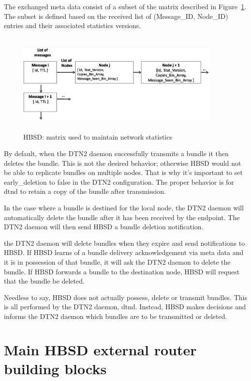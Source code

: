 The exchanged meta data consist of a subset of the matrix described in Figure~\ref{Stat-Mat}. The subset is defined based on the received list of (Message\_ID, Node\_ID) entries and their associated statistics versions.


\begin{figure}[!h]
\centering
\includegraphics[width=4in,height=2in]{Chapitre4/Stat_Matrix.eps}
\caption{HBSD: matrix used to maintain network statistics}
\label{Stat-Mat}
\end{figure}

By default, when the DTN2 daemon successfully transmits a bundle it then deletes the bundle. This is
not the desired behavior; otherwise HBSD would not be able to replicate bundles on
multiple nodes. That is why it's important to set early\_deletion to false in the DTN2
configuration. The proper behavior is for dtnd to retain a copy of the bundle after
transmission.

In the case where a bundle is destined for the local node, the DTN2 daemon will automatically delete
the bundle after it has been received by the endpoint. The DTN2 daemon will then send HBSD a
bundle deletion notification.

the DTN2 daemon will delete bundles when they expire and send notifications to HBSD.
If HBSD learns of a bundle delivery acknowledgement via meta data and it is in
possession of that bundle, it will ask the DTN2 daemon to delete the bundle.
If HBSD forwards a bundle to the destination node, HBSD will request that the bundle
be deleted.

Needless to say, HBSD does not actually possess, delete or transmit bundles. This is all
performed by the DTN2 daemon, dtnd. Instead, HBSD makes decisions and informs the DTN2 daemon which
bundles are to be transmitted or deleted.


\section{Main HBSD external router building blocks}

